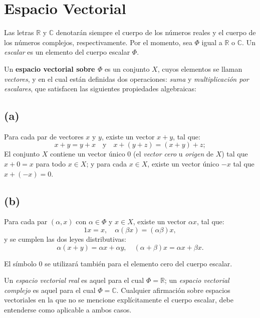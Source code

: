 \documentclass[12pt]{article}
\begin{document}
\section*{Espacio Vectorial}

\begin{definition}
Las letras \( \mathbb{R} \) y \( \mathbb{C} \) denotarán siempre el cuerpo de los números reales y el cuerpo de los números complejos, respectivamente. Por el momento, sea \( \Phi \) igual a \( \mathbb{R} \) o \( \mathbb{C} \). Un \textit{escalar} es un elemento del cuerpo escalar \( \Phi \). 

Un \textbf{espacio vectorial sobre \( \Phi \)} es un conjunto \( X \), cuyos elementos se llaman \textit{vectores}, y en el cual están definidas dos operaciones: \textit{suma} y \textit{multiplicación por escalares}, que satisfacen las siguientes propiedades algebraicas:

\subsection*{(a)} 
Para cada par de vectores \( x \) y \( y \), existe un vector \( x + y \), tal que:
\[
x + y = y + x \quad \text{y} \quad x + (y + z) = (x + y) + z;
\]
El conjunto \( X \) contiene un vector único \( 0 \) (el \textit{vector cero} u \textit{origen} de \( X \)) tal que \( x + 0 = x \) para todo \( x \in X \); y para cada \( x \in X \), existe un vector único \( -x \) tal que \( x + (-x) = 0 \).

\subsection*{(b)} 
Para cada par \( (\alpha, x) \) con \( \alpha \in \Phi \) y \( x \in X \), existe un vector \( \alpha x \), tal que:
\[
1x = x, \quad \alpha(\beta x) = (\alpha \beta)x,
\]
y se cumplen las dos leyes distributivas:
\[
\alpha(x + y) = \alpha x + \alpha y, \quad (\alpha + \beta)x = \alpha x + \beta x.
\]

El símbolo \( 0 \) se utilizará también para el elemento cero del cuerpo escalar.

Un \textit{espacio vectorial real} es aquel para el cual \( \Phi = \mathbb{R} \); un \textit{espacio vectorial complejo} es aquel para el cual \( \Phi = \mathbb{C} \). Cualquier afirmación sobre espacios vectoriales en la que no se mencione explícitamente el cuerpo escalar, debe entenderse como aplicable a ambos casos.

\end{definition}
\end{document}
